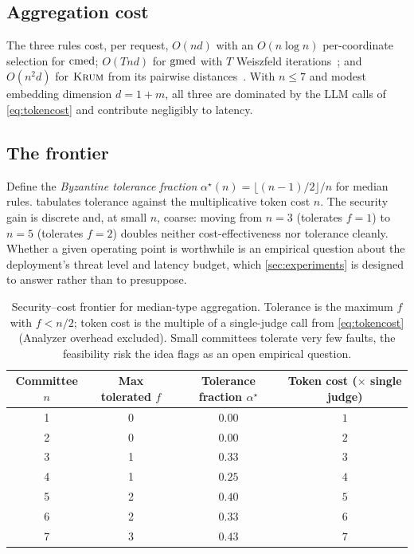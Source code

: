 \subsection{Aggregation cost}
The three rules cost, per request, $O(nd)$ with an $O(n\log n)$ per-coordinate selection for
$\operatorname{cmed}$; $O(Tnd)$ for $\operatorname{gmed}$ with $T$ Weiszfeld iterations~\cite{pillutla2022rfa}; and
$O(n^2 d)$ for $\textsc{Krum}$ from its pairwise distances~\cite{blanchard2017krum}. With $n\le 7$
and modest embedding dimension $d=1+m$, all three are dominated by the LLM calls of
\cref{eq:tokencost} and contribute negligibly to latency.

\subsection{The frontier}
Define the \emph{Byzantine tolerance fraction} $\alpha^\star(n)=\lfloor(n-1)/2\rfloor/n$ for
median rules.  tabulates tolerance against the multiplicative token cost
$n$. The security gain is discrete and, at small $n$, coarse: moving from $n=3$ (tolerates
$f=1$) to $n=5$ (tolerates $f=2$) doubles neither cost-effectiveness nor tolerance cleanly.
Whether a given operating point is worthwhile is an empirical question about the deployment's
threat level and latency budget, which \cref{sec:experiments} is designed to answer rather
than to presuppose.

\begin{table}[t]
\centering
\caption{Security--cost frontier for median-type aggregation. Tolerance is the maximum $f$
with $f<n/2$; token cost is the multiple of a single-judge call from \cref{eq:tokencost}
(Analyzer overhead excluded). Small committees tolerate very few faults, the feasibility
risk the idea flags as an open empirical question.}
\label{tab:cost}
\small
\begin{tabular}{@{}cccc@{}}
\toprule
Committee $n$ & Max tolerated $f$ & Tolerance fraction $\alpha^\star$ & Token cost (\(\times\) single judge) \\
\midrule
1 & 0 & $0.00$ & $1$ \\
2 & 0 & $0.00$ & $2$ \\
3 & 1 & $0.33$ & $3$ \\
4 & 1 & $0.25$ & $4$ \\
5 & 2 & $0.40$ & $5$ \\
6 & 2 & $0.33$ & $6$ \\
7 & 3 & $0.43$ & $7$ \\
\bottomrule
\end{tabular}
\end{table}
